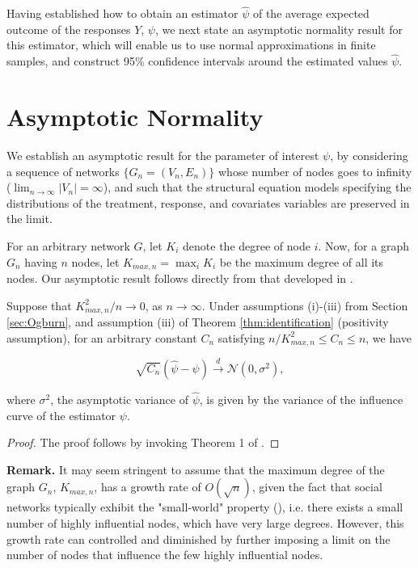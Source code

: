 \documentclass{article}
\begin{document}
Having established how to obtain an estimator $\hat{\psi}$ of the average expected outcome of the responses $Y$, $\psi$, we next state an asymptotic normality result for this estimator, which will enable us to use normal approximations in finite samples, and construct 95\% confidence intervals around the estimated values $\hat{\psi}$. 

\section{Asymptotic Normality}

We establish an asymptotic result for the parameter of interest $\psi$, by considering a sequence of networks $\{G_n = (V_n, E_n)\}$ whose number of nodes goes to infinity ($\lim_{n \to \infty}|V_n| = \infty$), and such that the structural equation models specifying the distributions of the treatment, response, and covariates variables are preserved in the limit. 

For an arbitrary network $G$, let $K_i$ denote the degree of node $i$. Now, for a graph $G_n$ having $n$ nodes, let $K_{max, n} = \max_i{K_i}$ be the maximum degree of all its nodes. Our asymptotic result follows directly from that developed in \cite{Ogburn:Sofrygin:Diaz:vanderLaan:2017}. 

\begin{theorem}
Suppose that $K_{max, n}^2/n \to 0$, as $n  \to \infty$. Under assumptions (i)-(iii) from Section \ref{sec:Ogburn}, and assumption (iii) of Theorem \ref{thm:identification} (positivity assumption), for an arbitrary constant $C_n$ satisfying $n/K_{max, n}^2 \leq C_n \leq n$, we have 

$$\sqrt{C_n} (\hat{\psi} - \psi)  \xrightarrow[]{d} \mathcal{N}(0, \sigma^2), $$

\noindent where $\sigma^2$, the asymptotic variance of $\hat{\psi}$, is given by the variance of the influence curve of the estimator $\psi$. 
\end{theorem}


\begin{proof}
The proof follows by invoking Theorem 1 of \cite{Ogburn:Sofrygin:Diaz:vanderLaan:2017}. 
\end{proof}

\textbf{Remark.} It may seem stringent to assume that the maximum degree of the graph $G_n$,  $K_{max, n}$, has a growth rate of $O(\sqrt{n})$, given the fact that social networks typically exhibit the "small-world" property (\cite{Durrett:2006}), i.e. there exists a small number of highly influential nodes, which have very large degrees. However, this growth rate can controlled and diminished by further imposing a limit on the number of nodes that influence the few highly influential nodes. 
\end{document}
